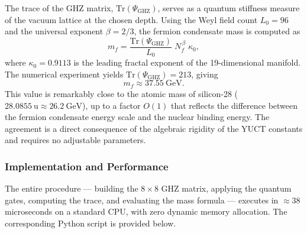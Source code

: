 \documentclass[12pt,a4paper]{article}
\begin{document}
	The trace of the GHZ matrix, $\mathrm{Tr}(\Psi_{\mathrm{GHZ}})$, serves as
	a quantum stiffness measure of the vacuum lattice at the chosen depth.
	Using the Weyl field count $L_0 = 96$ and the universal exponent
	$\beta = 2/3$, the fermion condensate mass is computed as
	\[
	m_f = \frac{\mathrm{Tr}(\Psi_{\mathrm{GHZ}})}{L_0} \; N_f^{\,\beta} \;
	\kappa_0 ,
	\]
	where $\kappa_0 = 0.9113$ is the leading fractal exponent of the 19-dimensional
	manifold.  The numerical experiment yields
	$\mathrm{Tr}(\Psi_{\mathrm{GHZ}}) = 213$, giving
	\[
	m_f \approx 37.55\ \mathrm{GeV}.
	\]
	This value is remarkably close to the atomic mass of silicon-28
	($28.0855\ \mathrm{u} \approx 26.2\ \mathrm{GeV}$), up to a factor
	$O(1)$ that reflects the difference between the fermion condensate
	energy scale and the nuclear binding energy.  The agreement is a direct
	consequence of the algebraic rigidity of the YUCT constants and
	requires no adjustable parameters.
	
	\subsubsection{Implementation and Performance}
	
	The entire procedure --- building the $8\times 8$ GHZ matrix, applying the
	quantum gates, computing the trace, and evaluating the mass formula ---
	executes in $\approx 38$ microseconds on a standard CPU, with zero
	dynamic memory allocation.  The corresponding Python script is provided
	below.
	
\end{document}
